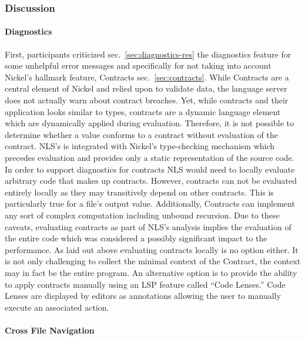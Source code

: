 \documentclass[
  a4paper,
  bibtex,
  english,
  nomenclature]{kthlatex/kththesis/kththesis}
\begin{document}
\hypertarget{sec:discussion}{%
\subsubsection{Discussion}\label{sec:discussion}}

\hypertarget{sec:diagnostics-2}{%
\paragraph{Diagnostics}\label{sec:diagnostics-2}}

First, participants criticized sec.~\ref{sec:diagnostics-res} the
diagnostics feature for some unhelpful error messages and specifically
for not taking into account Nickel's hallmark feature, Contracts
sec.~\ref{sec:contracts}. While Contracts are a central element of
Nickel and relied upon to validate data, the language server does not
actually warn about contract breaches. Yet, while contracts and their
application looks similar to types, contracts are a dynamic language
element which are dynamically applied during evaluation. Therefore, it
is not possible to determine whether a value conforms to a contract
without evaluation of the contract. NLS's is integrated with Nickel's
type-checking mechanism which precedes evaluation and provides only a
static representation of the source code. In order to support
diagnostics for contracts NLS would need to locally evaluate arbitrary
code that makes up contracts. However, contracts can not be evaluated
entirely locally as they may transitively depend on other contracts.
This is particularly true for a file's output value. Additionally,
Contracts can implement any sort of complex computation including
unbound recursion. Due to these caveats, evaluating contracts as part of
NLS's analysis implies the evaluation of the entire code which was
considered a possibly significant impact to the performance. As laid out
above evaluating contracts locally is no option either. It is not only
challenging to collect the minimal context of the Contract, the context
may in fact be the entire program. An alternative option is to provide
the ability to apply contracts manually using an LSP feature called
``Code Lenses.'' Code Lenses are displayed by editors as annotations
allowing the user to manually execute an associated action.

\hypertarget{sec:cross-file-navigation}{%
\paragraph{Cross File Navigation}\label{sec:cross-file-navigation}}
\end{document}
